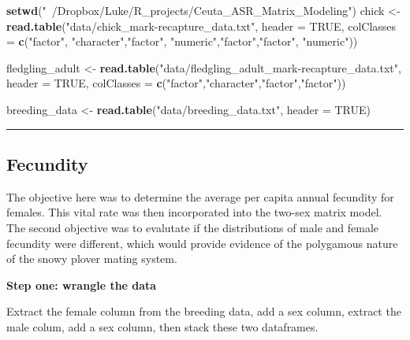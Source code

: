 \documentclass[]{article}
\newenvironment{Shaded}{\begin{snugshade}}{\end{snugshade}}
\newcommand{\KeywordTok}[1]{\textcolor[rgb]{0.13,0.29,0.53}{\textbf{{#1}}}}
\newcommand{\DataTypeTok}[1]{\textcolor[rgb]{0.13,0.29,0.53}{{#1}}}
\newcommand{\StringTok}[1]{\textcolor[rgb]{0.31,0.60,0.02}{{#1}}}
\newcommand{\OtherTok}[1]{\textcolor[rgb]{0.56,0.35,0.01}{{#1}}}
\newcommand{\NormalTok}[1]{{#1}}
\begin{document}
\begin{Shaded}
\begin{Highlighting}[]
\KeywordTok{setwd}\NormalTok{(}\StringTok{"~/Dropbox/Luke/R_projects/Ceuta_ASR_Matrix_Modeling"}\NormalTok{)}
\NormalTok{chick <-}\StringTok{ }
\StringTok{  }\KeywordTok{read.table}\NormalTok{(}\StringTok{"data/chick_mark-recapture_data.txt"}\NormalTok{,}
             \DataTypeTok{header =} \OtherTok{TRUE}\NormalTok{, }\DataTypeTok{colClasses =} \KeywordTok{c}\NormalTok{(}\StringTok{"factor"}\NormalTok{, }\StringTok{"character"}\NormalTok{,}\StringTok{"factor"}\NormalTok{,}
                                           \StringTok{"numeric"}\NormalTok{,}\StringTok{"factor"}\NormalTok{,}\StringTok{"factor"}\NormalTok{, }\StringTok{"numeric"}\NormalTok{))}

\NormalTok{fledgling_adult <-}\StringTok{ }
\StringTok{  }\KeywordTok{read.table}\NormalTok{(}\StringTok{"data/fledgling_adult_mark-recapture_data.txt"}\NormalTok{,}
             \DataTypeTok{header =} \OtherTok{TRUE}\NormalTok{, }\DataTypeTok{colClasses =} \KeywordTok{c}\NormalTok{(}\StringTok{"factor"}\NormalTok{,}\StringTok{"character"}\NormalTok{,}\StringTok{"factor"}\NormalTok{,}\StringTok{"factor"}\NormalTok{))}

\NormalTok{breeding_data <-}\StringTok{ }
\StringTok{  }\KeywordTok{read.table}\NormalTok{(}\StringTok{"data/breeding_data.txt"}\NormalTok{, }
             \DataTypeTok{header =} \OtherTok{TRUE}\NormalTok{)}
\end{Highlighting}
\end{Shaded}

\begin{center}\rule{0.5\linewidth}{\linethickness}\end{center}

\subsection{Fecundity}\label{fecundity}

The objective here was to determine the average per capita annual
fecundity for females. This vital rate was then incorporated into the
two-sex matrix model. The second objective was to evalutate if the
distributions of male and female fecundity were different, which would
provide evidence of the polygamous nature of the snowy plover mating
system.

\textbf{Step one: wrangle the data}

Extract the female column from the breeding data, add a sex column,
extract the male colum, add a sex column, then stack these two
dataframes.
\end{document}
